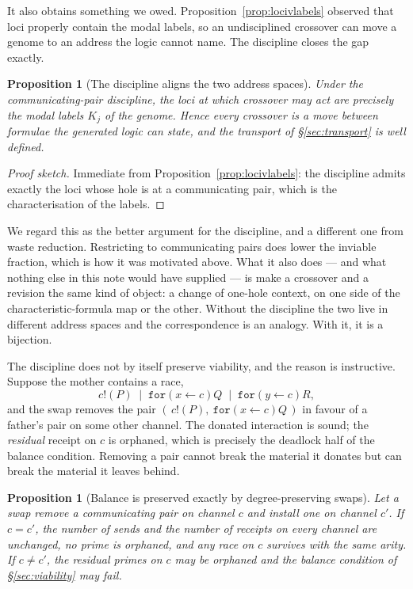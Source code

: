 \documentclass[11pt]{article}
\theoremstyle{plain}
\newtheorem{proposition}[theorem]{Proposition}
\theoremstyle{definition}
\begin{document}
It also obtains something we owed. Proposition~\ref{prop:locivlabels} observed that loci properly
contain the modal labels, so an undisciplined crossover can move a genome to an address the logic
cannot name. The discipline closes the gap exactly.

\begin{proposition}[The discipline aligns the two address spaces]
\label{prop:alignment}
Under the communicating-pair discipline, the loci at which crossover may act are precisely the
modal labels $K_j$ of the genome. Hence every crossover is a move between formulae the generated
logic can state, and the transport of \S\ref{sec:transport} is well defined.
\end{proposition}
\begin{proof}[Proof sketch]
Immediate from Proposition~\ref{prop:locivlabels}: the discipline admits exactly the loci whose
hole is at a communicating pair, which is the characterisation of the labels.
\end{proof}

We regard this as the better argument for the discipline, and a different one from waste reduction.
Restricting to communicating pairs does lower the inviable fraction, which is how it was motivated
above. What it also does --- and what nothing else in this note would have supplied --- is make a
crossover and a revision the same kind of object: a change of one-hole context, on one side of the
characteristic-formula map or the other. Without the discipline the two live in different address
spaces and the correspondence is an analogy. With it, it is a bijection.

The discipline does not by itself preserve viability, and the reason is instructive. Suppose the
mother contains a race,
\[
c!(P) \;\mid\; \texttt{for}(x \leftarrow c)Q \;\mid\; \texttt{for}(y \leftarrow c)R ,
\]
and the swap removes the pair $(\,c!(P),\ \texttt{for}(x \leftarrow c)Q\,)$ in favour of a father's
pair on some other channel. The donated interaction is sound; the \emph{residual} receipt on $c$ is
orphaned, which is precisely the deadlock half of the balance condition. Removing a pair cannot break
the material it donates but can break the material it leaves behind.

\begin{proposition}[Balance is preserved exactly by degree-preserving swaps]
\label{prop:degree}
Let a swap remove a communicating pair on channel $c$ and install one on channel $c'$. If $c = c'$,
the number of sends and the number of receipts on every channel are unchanged, no prime is orphaned,
and any race on $c$ survives with the same arity. If $c \ne c'$, the residual primes on $c$ may be
orphaned and the balance condition of \S\ref{sec:viability} may fail.
\end{proposition}
\end{document}
